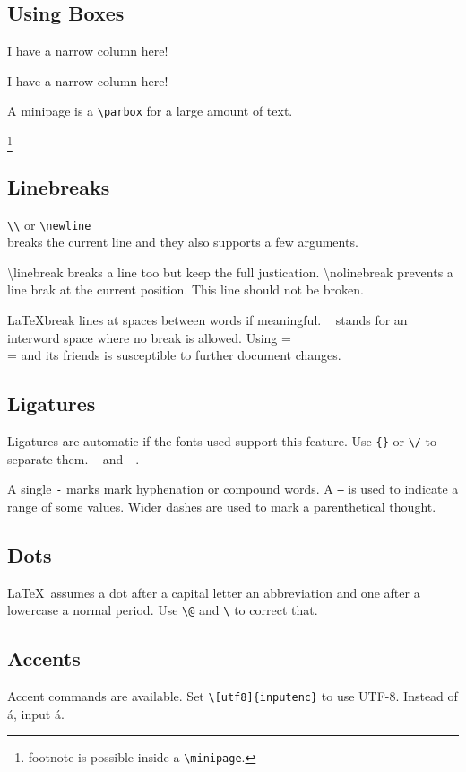 \documentclass[a4paper,12pt]{article}
\newcommand{\code}[1]{\texttt{#1}}
\begin{document}
\subsection{Using Boxes}

\parbox[t]{1cm}{I have a narrow column here!}
\quad
\parbox[b]{1cm}{I have a narrow column here!}
\quad
\begin{minipage}{3cm}
A minipage is a \code{\textbackslash parbox} for a large amount of text.

\footnote{footnote is possible inside a \code{\textbackslash minipage}.}
\end{minipage}

\subsection{Linebreaks}

\code{\textbackslash\textbackslash} or \code{\textbackslash newline} \\[1cm] breaks the current line
and they also supports a few arguments.

{\textbackslash linebreak} breaks a line too but keep the full justication. {\textbackslash nolinebreak} prevents a line brak at the current position. \nolinebreak[4] \linebreak[1]
This line should not be broken.

\LaTeX break lines at spaces between words if meaningful. \code{~} stands for an interword space where no break is allowed. Using =\\= and its friends is susceptible to further document changes.

\subsection{Ligatures}

Ligatures are automatic if the fonts used support this feature. Use \code{\{\}} or \code{\textbackslash/} to separate them. -- and -\/-.

A single \code{-} marks mark hyphenation or compound words. A \code{--} is used to indicate a range of some values. Wider dashes are used to mark a parenthetical thought.

\subsection{Dots}

\LaTeX\ assumes a dot after a capital letter an abbreviation and one after a lowercase a normal period. Use \code{\textbackslash @} and \code{\textbackslash } to correct that.

\subsection{Accents}

Accent commands are available. Set \code{\textbackslash [utf8]\{inputenc\}} to use UTF-8. Instead of
\'{a}, input  á.
\end{document}
